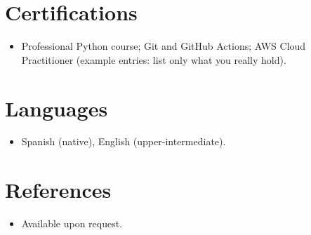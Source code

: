 \documentclass[11pt,a4paper,sans]{moderncv}
\begin{document}
\section{Certifications}
\vspace{1pt}
\begin{itemize}
\item {Professional Python course; Git and GitHub Actions; AWS Cloud Practitioner (example entries: list only what you really hold).}
\end{itemize}


\section{Languages}
\vspace{1pt}
\begin{itemize}
\item {Spanish (native), English (upper-intermediate).}
\end{itemize}


\section{References}
\vspace{1pt}
\begin{itemize}
\item{Available upon request.}
\end{itemize}
\end{document}
